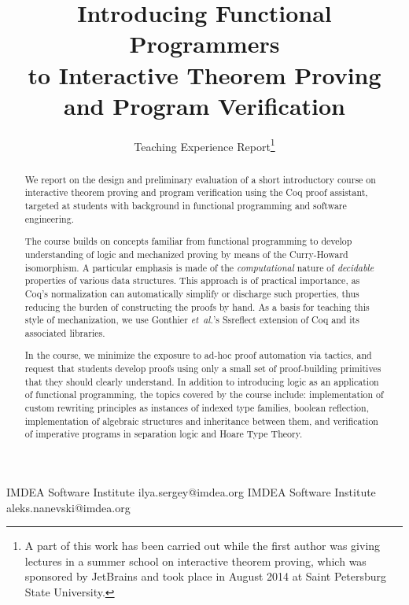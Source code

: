 \documentclass[blockstyle,preprint]{sigplanconf}
\newcommand{\etal}{\emph{et~al.}\xspace}
\begin{document}
\setlength{\pdfpageheight}{\paperheight}
\setlength{\pdfpagewidth}{\paperwidth}


           {IMDEA Software Institute}
           {ilya.sergey@imdea.org}
%
           {IMDEA Software Institute}
           {aleks.nanevski@imdea.org}

\title{
  Introducing Functional Programmers\\
  to Interactive Theorem Proving and Program Verification
}

\subtitle{Teaching Experience Report\thanks{A part of this work has
    been carried out while the first author was giving lectures in a
    summer school on interactive theorem proving, which was sponsored
    by JetBrains and took place in August 2014 at Saint Petersburg
    State University.}}
\maketitle

\begin{abstract}

  We report on the design and preliminary evaluation of a short
  introductory course on interactive theorem proving and program
  verification using the Coq proof assistant, targeted at students
  with background in functional programming and software engineering.

  The course builds on concepts familiar from functional programming
  to develop understanding of logic and mechanized proving by means of
  the Curry-Howard isomorphism. A particular emphasis is made of the
  \emph{computational} nature of \emph{decidable} properties of
  various data structures. This approach is of practical importance,
  as Coq's normalization can automatically simplify or discharge such
  properties, thus reducing the burden of constructing the proofs by
  hand. As a basis for teaching this style of mechanization, we use
  Gonthier \etal's Ssreflect extension of Coq and its associated
  libraries.
  
  In the course, we minimize the exposure to ad-hoc proof automation
  via tactics, and request that students develop proofs using only a
  small set of proof-building primitives that they should clearly
  understand. In addition to introducing logic as an application of
  functional programming, the topics covered by the course include:
  implementation of custom rewriting principles as instances of
  indexed type families, boolean reflection, implementation of
  algebraic structures and inheritance between them, and verification
  of imperative programs in separation logic and Hoare Type Theory.

\end{abstract}
\end{document}
